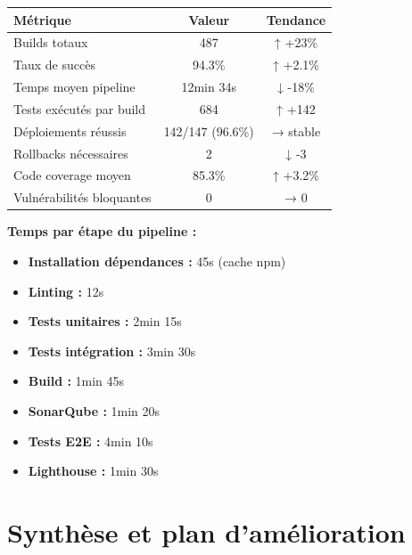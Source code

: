 \begin{tcolorbox}[colback=yellow!5!white,colframe=yellow!60!black,title=\textbf{Statistiques Pipeline CI/CD (Q4 2024)}]
\begin{center}
\begin{tabular}{|l|c|c|}
\hline
\textbf{Métrique} & \textbf{Valeur} & \textbf{Tendance} \\
\hline
Builds totaux & 487 & ↑ +23\% \\
Taux de succès & 94.3\% & ↑ +2.1\% \\
Temps moyen pipeline & 12min 34s & ↓ -18\% \\
Tests exécutés par build & 684 & ↑ +142 \\
Déploiements réussis & 142/147 (96.6\%) & → stable \\
Rollbacks nécessaires & 2 & ↓ -3 \\
Code coverage moyen & 85.3\% & ↑ +3.2\% \\
Vulnérabilités bloquantes & 0 & → 0 \\
\hline
\end{tabular}
\end{center}

\textbf{Temps par étape du pipeline :}
\begin{itemize}
    \item \textbf{Installation dépendances :} 45s (cache npm)
    \item \textbf{Linting :} 12s
    \item \textbf{Tests unitaires :} 2min 15s
    \item \textbf{Tests intégration :} 3min 30s
    \item \textbf{Build :} 1min 45s
    \item \textbf{SonarQube :} 1min 20s
    \item \textbf{Tests E2E :} 4min 10s
    \item \textbf{Lighthouse :} 1min 30s
\end{itemize}
\end{tcolorbox}

\section{Synthèse et plan d'amélioration}

